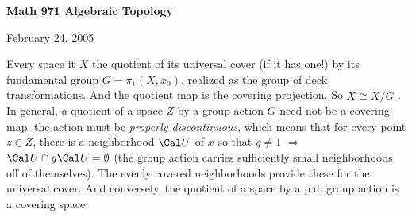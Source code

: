 \def\ccy{\Cyan}		  %
\def\cpb{\ProcessBlue}	  %
\def\csb{\SkyBlue}	  %
\def\ctu{\Turquoise}	  %
\def\ctb{\TealBlue}	  %
\def\caq{\Aquamarine}	  %
\def\cbg{\BlueGreen}	  %
\def\cem{\Emerald}	  %
\def\csg{\SeaGreen}	  %
\def\cgg{\Green}	  %
\def\cfg{\ForestGreen}	  %
\def\cpg{\PineGreen}	  %
\def\clg{\LimeGreen}	  %
\def\cyg{\YellowGreen}	  %
\def\cspg{\SpringGreen}	  %
\def\cog{\OliveGreen}	  %
\def\pars{\RawSienna}	  %
\def\cse{\Sepia}		  %
\def\cbr{\Brown}		  %
\def\cta{\Tan}		  %
\def\cgr{\Gray}		  %
\def\cbl{\Black}		  %
\def\cwh{\White}		  %


\loadmsbm



\def\ctln{\centerline}
\def\u{\underbar}
\def\ssk{\smallskip}
\def\msk{\medskip}
\def\bsk{\bigskip}
\def\hsk{\hskip.1in}
\def\hhsk{\hskip.2in}
\def\dsl{\displaystyle}
\def\hskp{\hskip1.5in}

\def\lra{$\Leftrightarrow$ }
\def\ra{\rightarrow}
\def\mpto{\logmapsto}
\def\pu{\pi_1}
\def\mpu{$\pi_1$}
\def\sig{\Sigma}
\def\msig{$\Sigma$}
\def\ep{\epsilon}
\def\sset{\subseteq}
\def\del{\partial}
\def\inv{^{-1}}
\def\wtl{\widetilde}
\def\lra{\Leftrightarrow}



\ctln{\bf Math 971 Algebraic Topology}

\ssk

\ctln{February 24, 2005}

\msk


Every space it $X$ the quotient of its universal cover (if it has
one!) by its fundamental group $G=\pu(X,x_0)$, realized as the group
of deck transformations. And the quotient map is the covering 
projection. 
So $X\cong \wtl{X}/G$ . In general, a quotient of a 
space $Z$ by a group action $G$ 
need not be 
a covering map; the action must be {\it properly discontinuous}, 
which means that for every point 
 $z\in Z$, there is a neighborhood ${\Cal U}$ of $x$ so that $g\neq 1$ $\Rightarrow$
${\Cal U}\cap g{\Cal U}=\emptyset$ (the group action carries sufficiently
small neighborhoods off of themselves). The evenly covered neighborhoods
provide these for the universal cover. And conversely, the quotient of a space by a 
p.d. group action is a covering space. 

